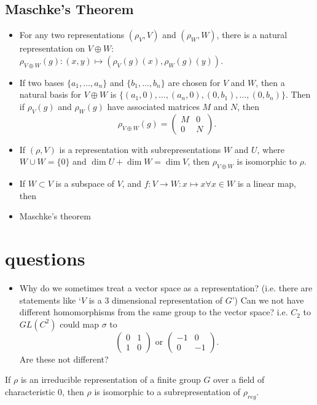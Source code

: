 \documentclass[a4paper]{article}
\begin{document}
\subsection{Maschke's Theorem}
\begin{itemize}
    \item For any two representations $(\rho_V, V)$ and $(\rho_W, W)$, there is a natural representation on $V \oplus W$: $\rho_{V \oplus W}(g): (x, y) \mapsto (\rho_V(g)(x), \rho_W(g)(y))$.
    \item If two bases $\{a_1, \hdots, a_n\}$ and $\{b_1, \hdots, b_n\}$ are chosen for $V$ and $W$, then a natural basis for $V \oplus W$ is $\{(a_1, 0), \hdots, (a_n,0), (0, b_1), \hdots, (0,b_n)\}$. Then if $\rho_V(g)$ and $\rho_W(g)$ have associated matrices $M$ and $N$, then $$\rho_{V \oplus W}(g) = \begin{pmatrix}M & 0 \\ 0 & N\end{pmatrix}.$$
    \item If $(\rho, V)$ is a representation with subrepresentations $W$ and $U$, where $W \cup W = \{0\}$ and $\dim U + \dim W = \dim V$, then $\rho_{V \oplus W}$ is isomorphic to $\rho$.
    \item If $W \subset V$ is a subspace of $V$, and $f : V \to W: x \mapsto x \forall x \in W$ is a linear map, then 
    \item Maschke's theorem
\end{itemize}

\newpage
\section{questions}
\begin{itemize}
    \item Why do we sometimes treat a vector space as a representation? (i.e. there are statements like `$V$ is a 3 dimensional representation of $G$') Can we not have different homomorphisms from the same group to the vector space? i.e. $C_2$ to $GL(C^2)$ could map $\sigma$ to $$\begin{pmatrix}0 & 1 \\ 1 & 0\end{pmatrix} \text{ or } \begin{pmatrix}-1 & 0 \\ 0 & -1\end{pmatrix}.$$ Are these not different? 
\end{itemize}

\begin{prop}
    If $\rho$ is an irreducible representation of a finite group $G$ over a field of characteristic 0, then $\rho$ is isomorphic to a subrepresentation of $\rho_{reg}$.
\end{prop}
\end{document}
